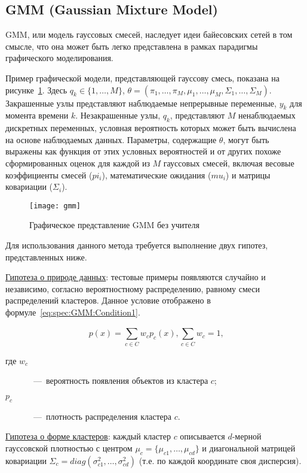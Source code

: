 \subsection{GMM (Gaussian Mixture Model)}
GMM, или модель гауссовых смесей, наследует идеи байесовских сетей в том смысле, что она может быть легко представлена в рамках парадигмы графического моделирования.

Пример графической модели, представляющей гауссову смесь, показана на рисунке~\ref{fig:spec:GmmRepresentation}. Здесь $q_k\in \{1,\dots,M\}$, $\theta = (\pi_1,\dots,\pi_M,\mu_1,\dots,\mu_M,\Sigma_1,\dots,\Sigma_M)$. Закрашенные узлы представляют наблюдаемые непрерывные переменные, $y_k$ для момента времени $k$. Незакрашенные узлы, $q_k$, представляют $M$ ненаблюдаемых дискретных переменных, условная вероятность которых может быть вычислена на основе наблюдаемых данных. Параметры, содержащие $\theta$, могут быть выражены как функция от этих условных вероятностей и от других похоже сформированных оценок для каждой из $M$ гауссовых смесей, включая весовые коэффициенты смесей ($pi_i$), математические ожидания ($mu_i$) и матрицы ковариации ($\Sigma_i$).

\begin{figure}[h]
\texttt{[image: gmm]}
\caption{Графическое представление GMM без учителя}
\label{fig:spec:GmmRepresentation}
\end{figure}

Для использования данного метода требуется выполнение двух гипотез, представленных ниже.

\uline{Гипотеза о природе данных}: тестовые примеры появляются случайно и независимо, согласно вероятностному распределению, равному смеси распределений кластеров. Данное условие отображено в формуле~\eqref{eq:spec:GMM:Condition1}.

\begin{equation} \label{eq:spec:GMM:Condition1}
p(x) = \sum_{c\in C}^{} w_c p_c(x), \sum_{c\in C}^{} w_c = 1\text{,}
\end{equation}
\begin{description}
	\item[где $w_c$]~---~вероятность появления объектов из кластера $c$;
	\item[$p_c$]~---~плотность распределения кластера $c$.
\end{description}

\uline{Гипотеза о форме кластеров}: каждый кластер $c$ описывается $d$-мерной гауссовской плотностью с центром $\mu_c = \{\mu_{c1},\dots,\mu_{cd}\}$ и диагональной матрицей ковариации $\Sigma_c = diag(\sigma^2_{c1},\dots,\sigma^2_{cd})$ (т.е. по каждой координате своя дисперсия).

